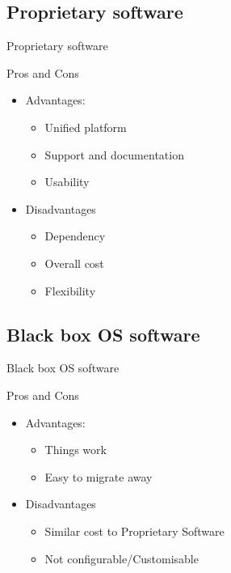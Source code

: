 \subsection{Proprietary software}
\begin{frame}{Proprietary software}
	\begin{block}{Pros and Cons}
		\begin{itemize}
			\item Advantages:
			\begin{itemize}
				\item Unified platform
				\item Support and documentation
				\item Usability
			\end{itemize}
			\item Disadvantages
			\begin{itemize}
				\item Dependency
				\item Overall cost
				\item Flexibility
			\end{itemize}
		\end{itemize}
	\end{block}
\end{frame}

\subsection{Black box OS software}
\begin{frame}{Black box OS software}
	\begin{block}{Pros and Cons}
		\begin{itemize}
			\item Advantages:
			\begin{itemize}
				\item Things work
				\item Easy to migrate away
			\end{itemize}
			\item Disadvantages
			\begin{itemize}
				\item Similar cost to Proprietary Software
				\item Not configurable/Customisable
			\end{itemize}
		\end{itemize}
	\end{block}
\end{frame}

